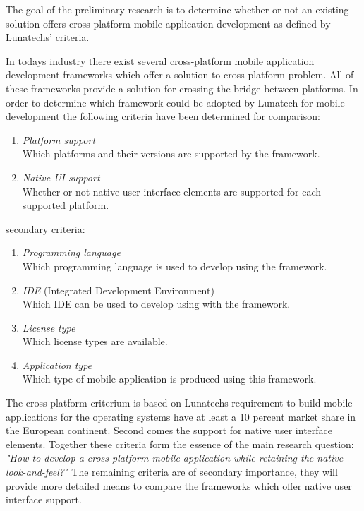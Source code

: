 
The goal of the preliminary research is to determine whether or not an existing solution offers cross-platform mobile application development as defined by Lunatechs' criteria.

In todays industry there exist several cross-platform mobile application development frameworks which offer a solution to cross-platform problem. All of these frameworks provide a solution for crossing the bridge between platforms. In order to determine which framework could be adopted by Lunatech for mobile development the following criteria have been determined for comparison:

\begin{enumerate}
\item \emph{Platform support}\\
Which platforms and their versions are supported by the framework.
\item \emph{Native UI support}\\
Whether or not native user interface elements are supported for each supported platform.
\end{enumerate}
\noindent secondary criteria:
\begin{enumerate}
\item \emph{Programming language}\\
Which programming language is used to develop using the framework.
\item \emph{IDE} (Integrated Development Environment)\\
Which IDE can be used to develop using with the framework.
\item \emph{License type}\\
Which license types are available.
\item \emph{Application type}\\
Which type of mobile application is produced using this framework.
\end{enumerate}

The cross-platform criterium is based on Lunatechs requirement to build mobile applications for the operating systems have at least a 10 percent market share in the European continent. Second comes the support for native user interface elements. Together these criteria form the essence of the main research question: \emph{"How to develop a cross-platform mobile application while retaining the native look-and-feel?"}
The remaining criteria are of secondary importance, they will provide more detailed means to compare the frameworks which offer native user interface support.

